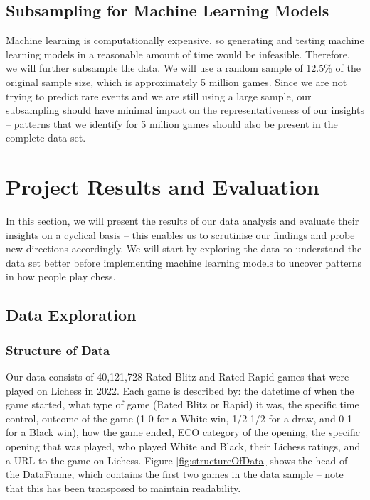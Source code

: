 \documentclass[a4paper, 11pt]{article}
\begin{document}
\subsection{Subsampling for Machine Learning Models}
Machine learning is computationally expensive, so generating and testing machine learning models in a reasonable amount of time would be infeasible. Therefore, we will further subsample the data. We will use a random sample of 12.5\% of the original sample size, which is approximately 5 million games. Since we are not trying to predict rare events and we are still using a large sample, our subsampling should have minimal impact on the representativeness of our insights -- patterns that we identify for 5 million games should also be present in the complete data set.


\section{Project Results and Evaluation}
In this section, we will present the results of our data analysis and evaluate their insights on a cyclical basis -- this enables us to scrutinise our findings and probe new directions accordingly. We will start by exploring the data to understand the data set better before implementing machine learning models to uncover patterns in how people play chess.

\subsection{Data Exploration}

\subsubsection{Structure of Data}
Our data consists of 40,121,728 Rated Blitz and Rated Rapid games that were played on Lichess in 2022. Each game is described by: the datetime of when the game started, what type of game (Rated Blitz or Rapid) it was, the specific time control, outcome of the game (1-0 for a White win, 1/2-1/2 for a draw, and 0-1 for a Black win), how the game ended, ECO category of the opening, the specific opening that was played, who played White and Black, their Lichess ratings, and a URL to the game on Lichess. Figure \ref{fig:structureOfData} shows the head of the DataFrame, which contains the first two games in the data sample -- note that this has been transposed to maintain readability.
\end{document}
